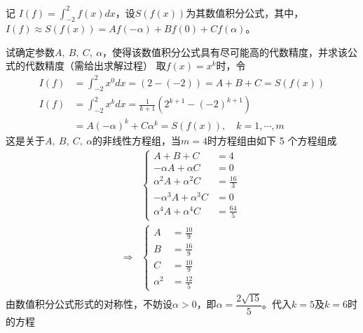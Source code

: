 \documentclass[11pt]{article}
\begin{document}
\begin{question}
    \questiontext
    {
        记 $I(f) = \displaystyle \int_{-2}^{2}{f(x)dx}$，设$S\left(f(x)\right)$为其数值积分公式，其中，$I(f) \approx S\left(f(x)\right) = Af(-\alpha) + Bf(0) + Cf(\alpha)$。
    }
    \begin{subquestion}{试确定参数$A,\ B,\ C,\ \alpha$，使得该数值积分公式具有尽可能高的代数精度，并求该公式的代数精度（需给出求解过程）}
        \answer
        {
            取$f(x) = x^k$时，令
            \begin{align*}
                I(f) & = \int_{-2}^{2}{x^0dx} = \left(2 - (-2)\right) = A + B + C = S\left(f(x)\right) \\
                I(f) & = \int_{-2}^{2}{x^kdx} = \frac{1}{k + 1}\left(2^{k + 1} - (-2)^{k + 1}\right)   \\
                     & = A(-\alpha)^k + C\alpha^k = S\left(f(x)\right),\quad k = 1,\cdots, m
            \end{align*}
            这是关于$A,\ B,\ C,\ \alpha$的非线性方程组，当$m = 4$时方程组由如下 5 个方程组成
            \begin{align*}
                            & \left\{
                \begin{aligned}
                    A + B + C                & = 4            \\
                    -\alpha A + \alpha C     & = 0            \\
                    \alpha^2 A + \alpha^2 C  & = \frac{16}{3} \\
                    -\alpha^3 A + \alpha^3 C & = 0            \\
                    \alpha^4 A + \alpha^4 C  & = \frac{64}{5}
                \end{aligned}
                \right.               \\
                \Rightarrow & \left\{
                \begin{aligned}
                    A        & = \frac{10}{9} \\
                    B        & = \frac{16}{9} \\
                    C        & = \frac{10}{9} \\
                    \alpha^2 & = \frac{12}{5}
                \end{aligned}
                \right.
            \end{align*}
            由数值积分公式形式的对称性，不妨设$\alpha > 0$，即$\alpha = \dfrac{2\sqrt{15}}{5}$。代入$k = 5$及$k = 6$时的方程
}
\end{subquestion}
\end{question}
\end{document}
